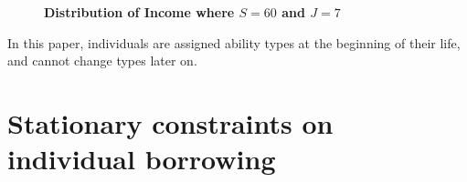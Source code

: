 \documentclass[letterpaper,12pt]{article}
\theoremstyle{definition}
\begin{document}
    \begin{figure}[htb]\centering \captionsetup{width=4.0in}
      \caption{\label{FigIncome}\textbf{Distribution of Income where $S=60$ and $J=7$}}
    \end{figure}

  In this paper, individuals are assigned ability types at the beginning of their life, and cannot change types later on.


\newpage
\section{Stationary constraints on individual borrowing}\label{AppBorConstr}

  \setcounter{equation}{0}
\end{document}
